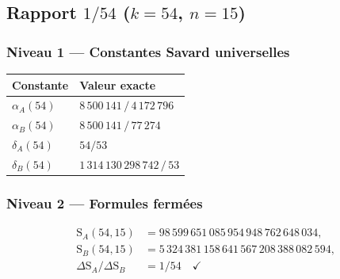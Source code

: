 \documentclass[11pt,a4paper]{article}
\newcommand{\SA}{\mathrm{S}_A}
\newcommand{\SB}{\mathrm{S}_B}
\begin{document}
\subsection{Rapport \texorpdfstring{$1/54$}{1/54} (\texorpdfstring{$k = 54$}{k = 54}, \texorpdfstring{$n = 15$}{n = 15})}
\subsubsection{Niveau 1 --- Constantes Savard universelles}

\begin{center}\small
\begin{tabular}{@{}l l@{}}
\toprule
\rowcolor{spectralgris}
Constante & Valeur exacte \\
\midrule
$\alpha_A(54)$ & $8\,500\,141\,/\,4\,172\,796$ \\
$\alpha_B(54)$ & $8\,500\,141\,/\,77\,274$ \\
$\delta_A(54)$ & $54/53$ \\
$\delta_B(54)$ & $1\,314\,130\,298\,742\,/\,53$ \\
\bottomrule
\end{tabular}
\end{center}

\subsubsection{Niveau 2 --- Formules fermées}
\begin{align*}
\SA(54,15)&=98\,599\,651\,085\,954\,948\,762\,648\,034,\\
\SB(54,15)&=5\,324\,381\,158\,641\,567\,208\,388\,082\,594,\\
\Delta\SA/\Delta\SB&=1/54\quad\checkmark
\end{align*}
\end{document}
